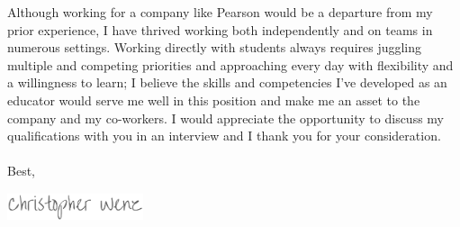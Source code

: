 \documentclass[11pt, a4paper]{awesome-cv}
\begin{document}
\begin{cvletter}
Although working for a company like Pearson would be a departure from my prior experience, I have thrived working both independently and on teams in numerous settings. Working directly with students always requires juggling multiple and competing priorities and approaching every day with flexibility and a willingness to learn; I believe the skills and competencies I've developed as an educator would serve me well in this position and make me an asset to the company and my co-workers. I would appreciate the opportunity to discuss my qualifications with you in an interview and I thank you for your consideration. 
\\\\
Best,
\end{cvletter}

\includegraphics[width=4cm, height=0.8cm]{./img/sig.png}
\end{document}
